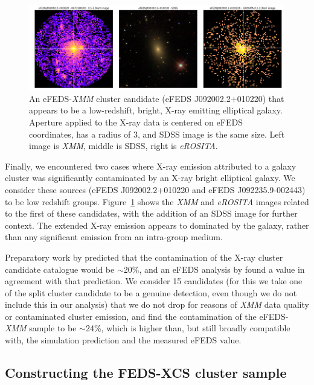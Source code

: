 \documentclass[fleqn,usenatbib]{mnras}
\begin{document}
\begin{figure}
    \centering
    \includegraphics[width=1\textwidth]{images/elliptical_xray.png}
    \caption[]{An eFEDS-{\em XMM} cluster candidate (eFEDS J092002.2+010220) that appears to be a low-redshift, bright, X-ray emitting elliptical galaxy. Aperture applied to the X-ray data is centered on eFEDS coordinates, has a radius of 3\arcmin, and SDSS image is the same size. Left image is {\em XMM}, middle is SDSS, right is {\em eROSITA}.}
    \label{fig:ellipticalxray}
\end{figure}

Finally, we encountered two cases where X-ray emission attributed to a galaxy cluster was significantly contaminated by an X-ray bright elliptical galaxy. We consider these sources (eFEDS J092002.2+010220 and eFEDS J092235.9-002443) to be low redshift groups.  Figure~\ref{fig:ellipticalxray} shows the {\em XMM} and {\em eROSITA} images related to the first of these candidates, with the addition of an SDSS image for further context. The extended X-ray emission appears to dominated by the galaxy, rather than any significant emission from an intra-group medium.

Preparatory work by \cite{simerass} predicted that the contamination of the X-ray cluster candidate catalogue would be ${\sim}$20\%, and an eFEDS analysis by \cite{efedsclusteropticalcat} found a value in agreement with that prediction. We consider 15 candidates (for this we take one of the split cluster candidate to be a genuine detection, even though we do not include this in our analysis) that we do not drop for reasons of {\em XMM} data quality or contaminated cluster emission, and find the contamination of the eFEDS-{\em XMM} sample to be ${\sim}$24\%, which is higher than, but still broadly compatible with, the simulation prediction and the measured eFEDS value.

\subsection{Constructing the FEDS-XCS cluster sample}
\end{document}
